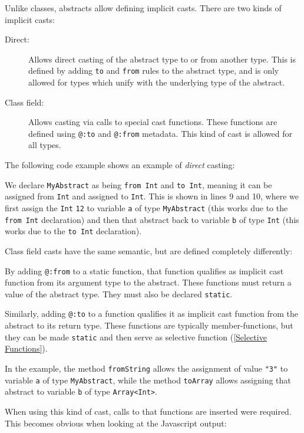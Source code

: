 \documentclass{article}
\newcommand{\target}[1]{#1}
\newcommand{\type}[1]{\texttt{#1}}
\newcommand{\expr}[1]{\texttt{#1}}
\newcommand{\tref}[2]{#1 (\ref{#2})}
\newcommand{\haxe}[2][]{%
}
\begin{document}
Unlike classes, abstracts allow defining implicit casts. There are two kinds of implicit casts:

\begin{description}
	\item[Direct:] Allows direct casting of the abstract type to or from another type. This is defined by adding \expr{to} and \expr{from} rules to the abstract type, and is only allowed for types which unify with the underlying type of the abstract.
	\item[Class field:] Allows casting via calls to special cast functions. These functions are defined using \expr{@:to} and \expr{@:from} metadata. This kind of cast is allowed for all types.
\end{description}
The following code example shows an example of \emph{direct} casting:

\haxe{assets/ImplicitCastDirect.hx}
We declare \type{MyAbstract} as being \expr{from Int} and \expr{to Int}, meaning it can be assigned from \type{Int} and assigned to \type{Int}. This is shown in lines 9 and 10, where we first assign the \type{Int} \expr{12} to variable \expr{a} of type \type{MyAbstract} (this works due to the \expr{from Int} declaration) and then that abstract back to variable \expr{b} of type \type{Int} (this works due to the \expr{to Int} declaration).

Class field casts have the same semantic, but are defined completely differently:

\haxe{assets/ImplicitCastField.hx}
By adding \expr{@:from} to a static function, that function qualifies as implicit cast function from its argument type to the abstract. These functions must return a value of the abstract type. They must also be declared \expr{static}.

Similarly, adding \expr{@:to} to a function qualifies it as implicit cast function from the abstract to its return type. These functions are typically member-functions, but they can be made \expr{static} and then serve as \tref{selective function}{Selective Functions}.

In the example, the method \expr{fromString} allows the assignment of value \expr{"3"} to variable \expr{a} of type \type{MyAbstract}, while the method \expr{toArray} allows assigning that abstract to variable \expr{b} of type \type{Array<Int>}.

When using this kind of cast, calls to that functions are inserted were required. This becomes obvious when looking at the \target{Javascript} output:
\end{document}
